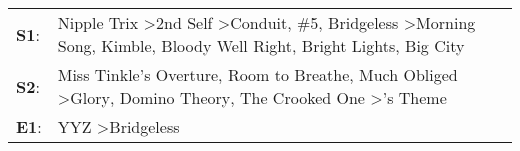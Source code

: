 \begin{supertabular}{p{0.03\textwidth}p{0.92\textwidth}}
 \textbf{S1}:  &  Nipple Trix\textsuperscript{} \textgreater \enspace 2nd Self\textsuperscript{} \textgreater \enspace Conduit\textsuperscript{}, \enspace \#5\textsuperscript{}, \enspace Bridgeless\textsuperscript{} \textgreater \enspace Morning Song\textsuperscript{}, \enspace Kimble\textsuperscript{}, \enspace Bloody Well Right\textsuperscript{}, \enspace Bright Lights, Big City\textsuperscript{}  \enspace  \\
 \textbf{S2}:  &                                                                             Miss Tinkle's Overture\textsuperscript{}, \enspace Room to Breathe\textsuperscript{}, \enspace Much Obliged\textsuperscript{} \textgreater \enspace Glory\textsuperscript{}, \enspace Domino Theory\textsuperscript{}, \enspace The Crooked One\textsuperscript{} \textgreater {}'s Theme\textsuperscript{}  \enspace  \\
 \textbf{E1}:  &                                                                                                                                                                                                                                                                                                                         YYZ\textsuperscript{} \textgreater \enspace Bridgeless\textsuperscript{}  \enspace  \\
\end{supertabular}
